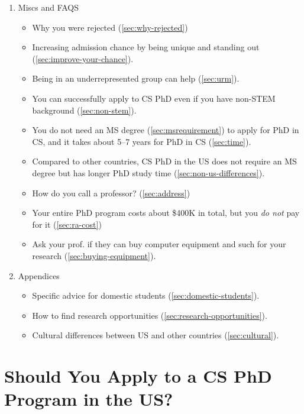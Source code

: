 \documentclass[oneside,11pt,dvipsnames]{book}
\begin{document}
\begin{enumerate}
    \item Miscs and FAQS
        \begin{itemize}
          \item Why you were rejected (\autoref{sec:why-rejected})
          \item Increasing admission chance by being unique and standing out (\autoref{sec:improve-your-chance}).
          \item Being in an underrepresented group can help (\autoref{sec:urm}).
          \item You can successfully apply to CS PhD even if you have non-STEM background (\autoref{sec:non-stem}).
          \item You do not need an MS degree (\autoref{sec:msrequirement}) to apply for PhD in CS, and it takes about 5--7 years for PhD in CS (\autoref{sec:time}).
          \item Compared to other countries, CS PhD in the US does not require an MS degree but has longer PhD study time (\autoref{sec:non-us-differences}).
          \item How do you call a professor? (\autoref{sec:address})
          \item Your entire PhD program costs about \$400K in total, but you \emph{do not} pay for it (\autoref{sec:ra-cost})
          \item Ask your prof. if they can buy computer equipment and such for your research (\autoref{sec:buying-equipment}).
        \end{itemize}


    \item Appendices
    \begin{itemize}
      \item Specific advice for domestic students (\autoref{sec:domestic-students}).
      \item How to find research opportunities (\autoref{sec:research-opportunities}).
      \item Cultural differences between US and other countries (\autoref{sec:cultural}).
    \end{itemize}

\end{enumerate}


\mainmatter
\chapter{Should You Apply to a CS PhD Program in the US?}\label{sec:should}
\end{document}
